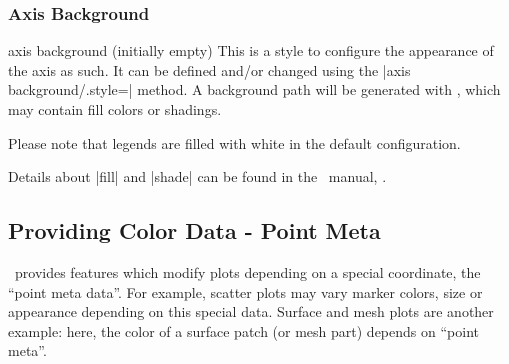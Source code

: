 \subsubsection{Axis Background}
\begin{pgfplotskey}{axis background (initially empty)}
	This is a style to configure the appearance of the axis as such. It can be defined and/or changed using the |axis background/.style=| method. A background path will be generated with , which may contain fill colors or shadings.

\pgfplotsexpensiveexample
\begin{codeexample}[]
\end{codeexample}

	Please note that legends are filled with white in the default configuration.
\begin{codeexample}[]
\end{codeexample}
	Details about |fill| and |shade| can be found in the \Tikz\ manual, \cite{tikz}.
\end{pgfplotskey}


\subsection{Providing Color Data - Point Meta}
\label{pgfplots:point:meta}
\PGFPlots\ provides features which modify plots depending on a special coordinate, the ``point meta data''. For example, scatter plots may vary marker colors, size or appearance depending on this special data. Surface and mesh plots are another example: here, the color of a surface patch (or mesh part) depends on ``point meta''.

